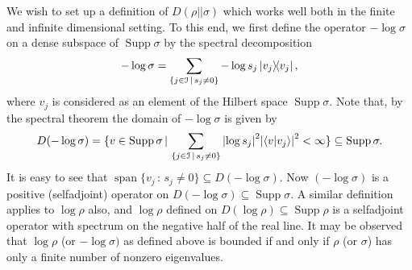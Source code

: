 \documentclass[12pt,a4paper,oneside]{article}
\numberwithin{equation}{section}
\theoremstyle{definition}  %
\theoremstyle{plain}  %
\theoremstyle{remark} %
\DeclareMathOperator{\supp}{Supp}
\DeclareMathOperator{\spn}{span}
\begin{document}
We wish to set up a definition of $D(\rho||\sigma)$ which  works well both in the finite  and  infinite dimensional setting.  To this end, we first define the operator $-\log \sigma$ on a dense subspace of $\supp \sigma$ by the spectral decomposition
\begin{align}\label{eq:log-sigma}
    -\log \sigma = \sum\limits_{\{j\in \mathcal{I}\,|\, s_j\neq 0\}}-\log s_j\ketbra{v_j},
\end{align}
where $v_j$ is considered as an element of the Hilbert space $\supp \sigma$.
Note that, by the spectral theorem the domain of $-\log \sigma$ is given by \begin{align}\label{eq:domain-logsigma}
    D(-\log \sigma) = \{v\in \supp \sigma\,|\, \sum_{\{j\in \mathcal{I}\,|\,s_j\neq 0\}} \abs{\log s_j}^2\abs{\braket{v}{v_j}}^2<\infty\}\subseteq \supp \sigma.
\end{align}
    It is easy to see that $\spn\{v_j\,:\, s_j\neq 0\}\subseteq D(-\log \sigma)$.
Now $(-\log \sigma)$ is a positive (selfadjoint) operator on $D(-\log \sigma)\subseteq \supp\sigma$.  A similar definition applies to $\log \rho$ also, and $\log \rho$ defined on $D(\log \rho)\subseteq \supp \rho$ is a selfadjoint operator with spectrum on the negative half of the real line. It may be observed that $\log \rho $ (or $-\log \sigma)$ as defined above is bounded if and only if $\rho$ (or $\sigma$) has only a finite number of nonzero eigenvalues.
\end{document}
